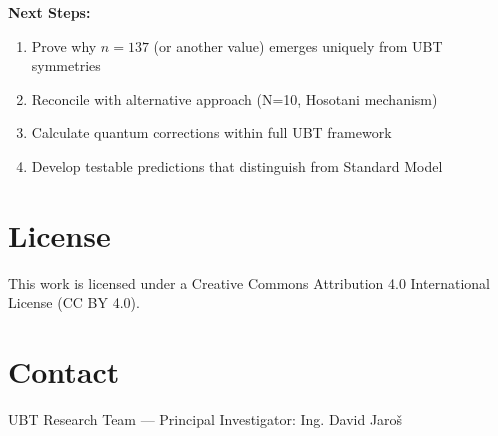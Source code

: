 \documentclass[12pt, a4paper]{article}
\begin{document}
\vspace{1em}

\textbf{Next Steps:}
\begin{enumerate}
\item Prove why $n=137$ (or another value) emerges uniquely from UBT symmetries
\item Reconcile with alternative approach (N=10, Hosotani mechanism)
\item Calculate quantum corrections within full UBT framework
\item Develop testable predictions that distinguish from Standard Model
\end{enumerate}

\vfill

\section*{License}
This work is licensed under a Creative Commons Attribution 4.0 International License (CC BY 4.0).

\section*{Contact}
UBT Research Team — Principal Investigator: Ing. David Jaroš
\end{document}
